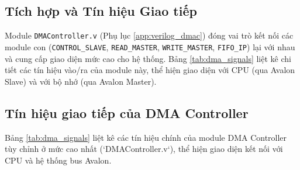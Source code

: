 \subsection{Tích hợp và Tín hiệu Giao tiếp}
Module \texttt{DMAController.v} (Phụ lục \ref{app:verilog_dmac}) đóng vai trò kết nối các module con (\texttt{CONTROL\_SLAVE}, \texttt{READ\_MASTER}, \texttt{WRITE\_MASTER}, \texttt{FIFO\_IP}) lại với nhau và cung cấp giao diện mức cao cho hệ thống. Bảng \ref{tab:dma_signals} liệt kê chi tiết các tín hiệu vào/ra của module này, thể hiện giao diện với CPU (qua Avalon Slave) và với bộ nhớ (qua Avalon Master).

\subsection{Tín hiệu giao tiếp của DMA Controller}
Bảng \ref{tab:dma_signals} liệt kê các tín hiệu chính của module DMA Controller tùy chỉnh ở mức cao nhất (`DMAController.v`), thể hiện giao diện kết nối với CPU và hệ thống bus Avalon.

